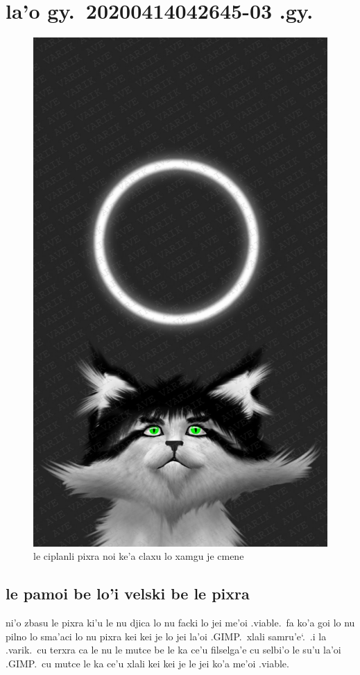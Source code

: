 \documentclass{report}
\newcommand\sds{\spacefactor\sfcode`.\ \space}
\begin{document}
\chapter{la'o gy.\ 20200414042645-03 .gy.}
\begin{figure}[ht]
	\centering
	\includegraphics[keepaspectratio, width=\textwidth, height=0.75\textheight]{20200414042645-03/20200414042645-03.jpg}
	\caption[center]{le ciplanli pixra noi ke'a claxu lo xamgu je cmene}
\end{figure}
\section{le pamoi be lo'i velski be le pixra}
ni'o zbasu le pixra ki'u le nu djica lo nu facki lo jei me'oi .viable.\ fa ko'a goi lo nu pilno lo sma'aci lo nu pixra kei kei je lo jei la'oi .GIMP.\ xlali samru'e\sds  .i la .varik.\ cu terxra ca le nu le mutce be le ka ce'u filselga'e cu selbi'o le su'u la'oi .GIMP.\ cu mutce le ka ce'u xlali kei kei je le jei ko'a me'oi .viable.
\end{document}
